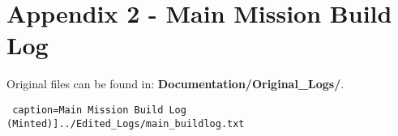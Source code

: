 \documentclass{article}
\begin{document}
\section*{Appendix 2 - Main Mission Build Log}

Original files can be found in: \textbf{Documentation/Original\_Logs/}.

\texttt{ caption=Main Mission Build Log (Minted)]{../Edited_Logs/main_buildlog.txt}}
\end{document}
